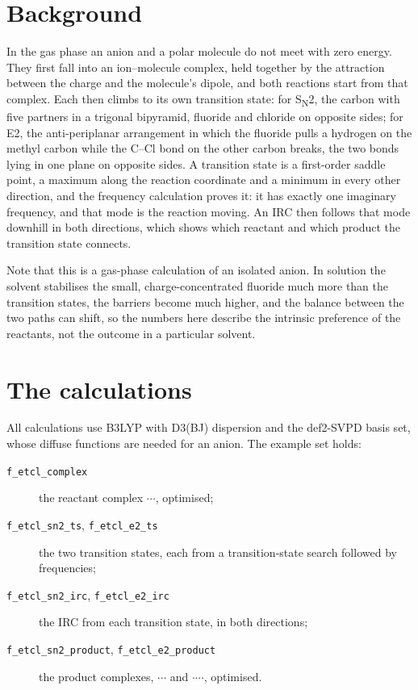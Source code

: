\section{Background}
In the gas phase an anion and a polar molecule do not meet with zero energy. They first fall into an ion--molecule complex, held together by the attraction between the charge and the molecule's dipole, and both reactions start from that complex. Each then climbs to its own transition state: for S\textsubscript{N}2, the carbon with five partners in a trigonal bipyramid, fluoride and chloride on opposite sides; for E2, the anti-periplanar arrangement in which the fluoride pulls a hydrogen on the methyl carbon while the C--Cl bond on the other carbon breaks, the two bonds lying in one plane on opposite sides. A transition state is a first-order saddle point, a maximum along the reaction coordinate and a minimum in every other direction, and the frequency calculation proves it: it has exactly one imaginary frequency, and that mode is the reaction moving. An IRC then follows that mode downhill in both directions, which shows which reactant and which product the transition state connects.

Note that this is a gas-phase calculation of an isolated anion. In solution the solvent stabilises the small, charge-concentrated fluoride much more than the transition states, the barriers become much higher, and the balance between the two paths can shift, so the numbers here describe the intrinsic preference of the reactants, not the outcome in a particular solvent.

\section{The calculations}
All calculations use B3LYP with D3(BJ) dispersion and the def2-SVPD basis set, whose diffuse functions are needed for an anion. The example set holds:
\begin{description}
	\item[\texttt{f\_etcl\_complex}] the reactant complex $\cdots$, optimised;
	\item[\texttt{f\_etcl\_sn2\_ts}, \texttt{f\_etcl\_e2\_ts}] the two transition states, each from a transition-state search followed by frequencies;
	\item[\texttt{f\_etcl\_sn2\_irc}, \texttt{f\_etcl\_e2\_irc}] the IRC from each transition state, in both directions;
	\item[\texttt{f\_etcl\_sn2\_product}, \texttt{f\_etcl\_e2\_product}] the product complexes, $\cdots$ and $\cdot$$\cdots$, optimised.
\end{description}

